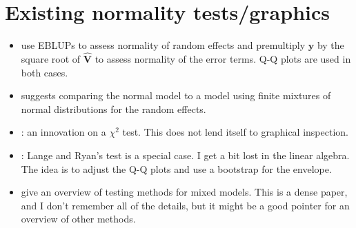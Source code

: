 \documentclass[11pt]{article} %
\begin{document}
\section{Existing normality tests/graphics}

\begin{itemize}

\item \cite{calvin1991} use EBLUPs to assess normality of random effects and premultiply $\bm{y}$ by the square root of $\widehat{\bm{V}}$ to assess normality of the error terms. Q-Q plots are used in both cases.

\item \cite{Verbeke:1996va} suggests comparing the normal model to a model using finite mixtures of normal distributions for the random effects.

\item \cite{Jiang:2001up}: an innovation on a $\chi^2$ test. This does not lend itself to graphical inspection.

\item \cite{houseman2006}: Lange and Ryan's test is a special case. I get a bit lost in the linear algebra. The idea is to adjust the Q-Q plots and use a bootstrap for the envelope.

\item \cite{claeskens2009} give an overview of testing methods for mixed models. This is a dense paper, and I don't remember all of the details, but it might be a good pointer for an overview of other methods.

\end{itemize}



\end{document}
